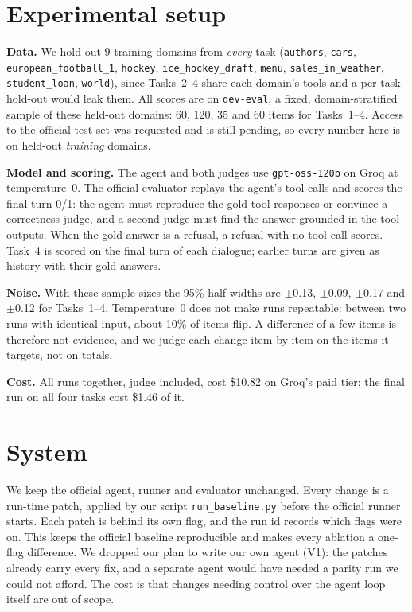 \documentclass[10pt]{article}
\begin{document}
\section{Experimental setup}
\textbf{Data.} We hold out 9 training domains from \emph{every} task (\texttt{authors},
\texttt{cars}, \texttt{european\_football\_1}, \texttt{hockey}, \texttt{ice\_hockey\_draft},
\texttt{menu}, \texttt{sales\_in\_weather}, \texttt{student\_loan}, \texttt{world}), since Tasks~2--4 share each domain's
tools and a per-task hold-out would leak them. All scores are on \texttt{dev-eval}, a fixed,
domain-stratified sample of these held-out domains: 60, 120, 35 and 60 items for Tasks~1--4.
Access to the official test set was requested and is still pending, so every number here is on
held-out \emph{training} domains.

\textbf{Model and scoring.} The agent and both judges use \texttt{gpt-oss-120b} on Groq at
temperature~0. The official evaluator replays the agent's tool calls and scores the final turn
0/1: the agent must reproduce the gold tool responses or convince a correctness judge, and a
second judge must find the answer grounded in the tool outputs. When the gold answer is a
refusal, a refusal with no tool call scores. Task~4 is scored on the final turn of each
dialogue; earlier turns are given as history with their gold answers.

\textbf{Noise.} With these sample sizes the 95\% half-widths are $\pm$0.13, $\pm$0.09,
$\pm$0.17 and $\pm$0.12 for Tasks~1--4. Temperature~0 does not make runs repeatable: between two
runs with identical input, about 10\% of items flip. A difference of a few items is therefore
not evidence, and we judge each change item by item on the items it targets, not on totals.

\textbf{Cost.} All runs together, judge included, cost \$10.82 on Groq's paid
tier; the final run on all four tasks cost \$1.46 of it.

\section{System}
We keep the official agent, runner and evaluator unchanged. Every change is a run-time patch,
applied by our script \texttt{run\_baseline.py} before the official runner starts. Each patch is
behind its own flag, and the run id records which flags were on. This keeps the official baseline
reproducible and makes every ablation a one-flag difference. We dropped our plan to write our
own agent (V1): the patches already carry every fix, and a separate agent would have needed a
parity run we could not afford. The cost is that changes needing control over the agent loop
itself are out of scope.
\end{document}
